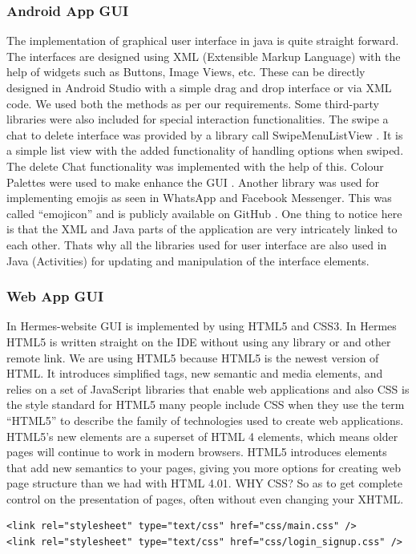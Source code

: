 \documentclass{article}
\begin{document}
\subsubsection{Android App GUI}
The implementation of graphical user interface in java is quite straight forward. The interfaces are designed using XML (Extensible Markup Language) with the help of widgets such as Buttons, Image Views, etc. These can be directly designed in Android Studio with a simple drag and drop interface or via XML code. We used both the methods as per our requirements.
Some third-party libraries were also included for special interaction functionalities. The swipe a chat to delete interface was provided by a library call SwipeMenuListView \cite{lib2}. It is a simple list view with the added functionality of handling options when swiped. The delete Chat functionality was implemented with the help of this. Colour Palettes were used to make enhance the GUI \cite{ColorHex}. 
Another library was used for implementing emojis as seen in WhatsApp and Facebook Messenger. This was called “emojicon” and is publicly available on GitHub \cite{lib1}.
One thing to notice here is that the XML and Java parts of the application are very intricately linked to each other. Thats why all the libraries used for user interface are also used in Java (Activities) for updating and manipulation of the interface elements. 

\subsubsection{Web App GUI}
In Hermes-website GUI is implemented by using HTML5 and CSS3.
In Hermes HTML5 is written straight on the IDE without using any library or and other remote link. We are using HTML5 because   HTML5 is the newest version of HTML. It introduces simplified tags, new semantic and media elements, and relies on a set of JavaScript libraries that enable web applications and also CSS is the style standard for HTML5 many people include CSS when they use the term “HTML5” to describe the family of technologies used to create web applications.
HTML5’s new elements are a superset of HTML 4 elements, which means older pages will continue to work in modern browsers. HTML5 introduces elements that add new semantics to your pages, giving you more options for creating web page structure than we had with HTML 4.01.
WHY CSS? So as to get complete control on the presentation of pages, often without even changing your XHTML.
\begin{lstlisting}
<link rel="stylesheet" type="text/css" href="css/main.css" />
<link rel="stylesheet" type="text/css" href="css/login_signup.css" />
\end{lstlisting}
\end{document}

